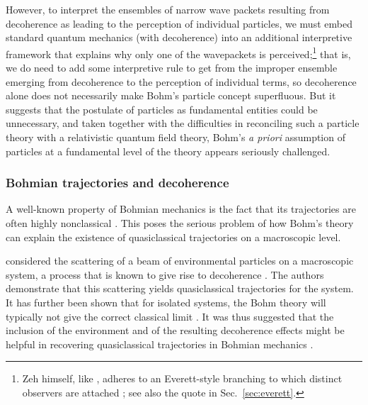 \documentclass[rmp,aps,amsmath,amsfonts,noshowkeys,noshowpacs,12pt]{revtex4}
\begin{document}
However, to interpret the ensembles of narrow wave packets resulting
from decoherence as leading to the perception of individual particles,
we must embed standard quantum mechanics (with decoherence) into an
additional interpretive framework that explains why only one of the
wavepackets is perceived;\footnote{Zeh himself, like
  \citet{Zurek:1998:re}, adheres to an Everett-style branching to
  which distinct observers are attached \citep{Zeh:1993:lt}; see also
  the quote in Sec.~\ref{sec:everett}.}  that is, we do need to add
some interpretive rule to get from the improper ensemble emerging from
decoherence to the perception of individual terms, so decoherence
alone does not necessarily make Bohm's particle concept superfluous.
But it suggests that the postulate of particles as fundamental
entities could be unnecessary, and taken together with the
difficulties in reconciling such a particle theory with a relativistic
quantum field theory, Bohm's \emph{a priori} assumption of particles
at a fundamental level of the theory appears seriously challenged.


\subsubsection{Bohmian trajectories and decoherence}
 
A well-known property of Bohmian mechanics is the fact that its
trajectories are often highly nonclassical \citep[see, for
example,][]{Bohm:1993:ll,Holland:1993:fc,Appleby:1999:uy}.  This poses
the serious problem of how Bohm's theory can explain the existence of
quasiclassical trajectories on a macroscopic level.

\citet{Bohm:1993:ll} considered the scattering of a beam of
environmental particles on a macroscopic system, a process that is
known to give rise to decoherence \citep{Joos:1985:iu,Joos:2003:jh}.
The authors demonstrate that this scattering yields quasiclassical
trajectories for the system. It has further been shown that for
isolated systems, the Bohm theory will typically not give the correct
classical limit \citep{Appleby:1999:uy}.  It was thus suggested that
the inclusion of the environment and of the resulting decoherence
effects might be helpful in recovering quasiclassical trajectories in
Bohmian mechanics
\citep{Appleby:1999:zs,Zeh:1999:rr,Allori:2001:po,Allori:2001:tc,Allori:2001:vl,Sanz:2003:za}.
\end{document}
